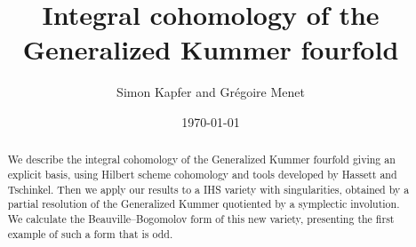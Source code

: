 \documentclass[a4paper]{article}
\begin{document}
\title{\bf Integral cohomology of the Generalized Kummer fourfold}


\author{Simon Kapfer and Gr\'egoire Menet}


\date{\today}

\maketitle
\begin{abstract}
We describe the integral cohomology of the Generalized Kummer fourfold giving an explicit basis, using Hilbert scheme cohomology and tools developed by Hassett and Tschinkel.
Then we apply our results to a IHS variety with singularities, obtained by a partial resolution of the Generalized Kummer quotiented by a symplectic involution. 
We calculate the Beauville--Bogomolov form of this new variety, presenting the first example of such a form that is odd.
\end{abstract}


%
%
%
%









\end{document}
